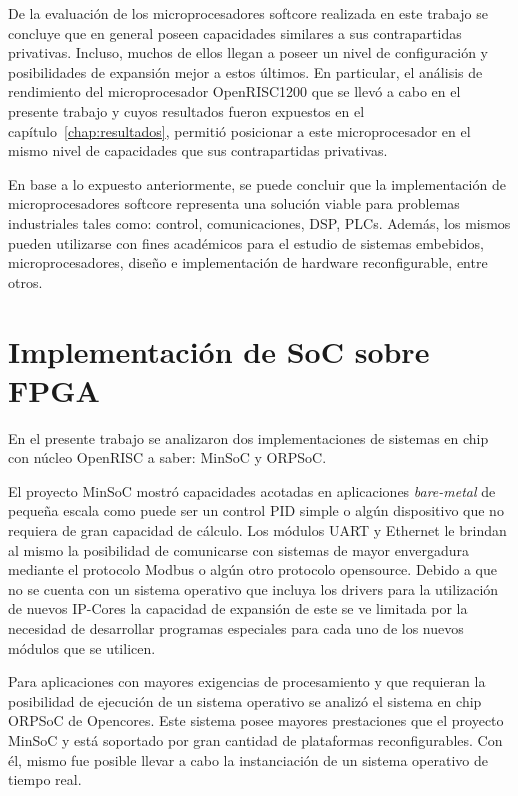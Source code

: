 De la evaluación de los microprocesadores softcore realizada en este trabajo se concluye que en general poseen capacidades similares a sus
contrapartidas privativas. Incluso, muchos de ellos llegan a poseer un nivel de configuración y posibilidades de expansión mejor a estos últimos.
En particular, el análisis de rendimiento del microprocesador OpenRISC1200 que se llevó a cabo en el presente trabajo y cuyos resultados fueron
expuestos en el capítulo~\ref {chap:resultados}, permitió posicionar a este microprocesador en el mismo nivel de capacidades que sus contrapartidas
privativas.

En base a lo expuesto anteriormente, se puede concluir que la implementación de microprocesadores softcore representa una solución viable para
problemas industriales tales como: control, comunicaciones, DSP, PLCs. Además, los mismos pueden utilizarse con fines académicos para el estudio de
sistemas embebidos, microprocesadores, diseño e implementación de hardware reconfigurable, entre otros.

\section{Implementación de SoC sobre FPGA}

En el presente trabajo se analizaron dos implementaciones de sistemas en chip con núcleo OpenRISC a saber: MinSoC y ORPSoC.

El proyecto MinSoC mostró capacidades acotadas en aplicaciones \textit{bare-metal} de pequeña escala como puede ser un control PID simple o algún
dispositivo que no requiera de gran capacidad de cálculo. Los módulos UART y Ethernet le brindan al mismo la posibilidad de comunicarse con sistemas
de mayor envergadura mediante el protocolo Modbus o algún otro protocolo opensource. Debido a que no se cuenta con un sistema operativo que incluya
los drivers para la utilización de nuevos IP-Cores la capacidad de expansión de este se ve limitada por la necesidad de desarrollar programas
especiales para cada uno de los nuevos módulos que se utilicen.

Para aplicaciones con mayores exigencias de procesamiento y que requieran la posibilidad de ejecución de un sistema operativo se analizó el sistema
en chip ORPSoC de Opencores. Este sistema posee mayores prestaciones que el proyecto MinSoC y está soportado por gran cantidad de plataformas
reconfigurables. Con él, mismo fue posible llevar a cabo la instanciación de un sistema operativo de tiempo real.
 
